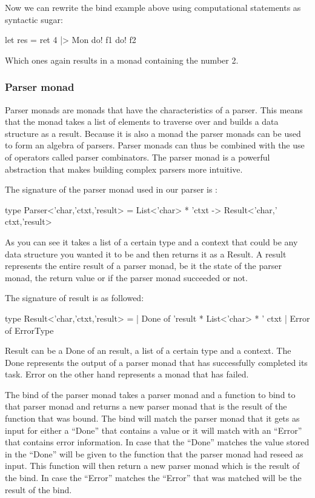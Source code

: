 Now we can rewrite the bind example above using computational statements as syntactic sugar:

\begin{code}
	let res = ret 4 |> Mon {
		do! f1
		do! f2
	} 
\end{code}

Which ones again results in a monad containing the number 2.

\subsubsection{Parser monad}

Parser monads are monads that have the characteristics of a parser. This means that the monad takes a list of elements to traverse over and builds a data structure as a result. Because it is also a monad the parser monads can be used to form an algebra of parsers. Parser monads can thus be combined with the use of operators called parser combinators. The parser monad is a powerful abstraction that makes building complex parsers more intuitive. 

The signature of the parser monad used in our parser is : 

\begin{code}
	type Parser<'char,'ctxt,'result> = List<'char> * 'ctxt -> Result<'char,' ctxt,'result> 
\end{code}

As you can see it takes a list of a certain type and a context that could be any data structure you wanted it to be and then returns it as a Result. A result represents the entire result of a parser monad, be it the state of the parser monad, the return value or if the parser monad succeeded or not.

The signature of result is as followed: 

\begin{code}
	type Result<'char,'ctxt,'result> = | Done of 'result * List<'char> * ' ctxt | Error of ErrorType 
\end{code}

Result can be a Done of an result, a list of a certain type and a context. The Done represents the output of a parser monad that has successfully completed its task. Error on the other hand represents a monad that has failed. 

The bind of the parser monad takes a parser monad and a function to bind to that parser monad and returns a new parser monad that is the result of the function that was bound. The bind will match the parser monad that it gets as input for either a “Done” that contains a value or it will match with an “Error” that contains error information.
In case that the “Done” matches the value stored in the “Done” will be given to the function that the parser monad had reseed as input. This function will then return a new parser monad which is the result of the bind. In case the “Error” matches the “Error” that was matched will be the result of the bind.

